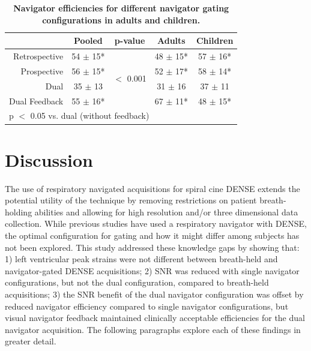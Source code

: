 	\begin{table}
		\centering
		\caption[Navigator efficiencies for different navigator gating configurations in adults and children]{\textbf{Navigator efficiencies for different navigator gating configurations in adults and children.}}
		\label{table:navigator_navefficiency}
		\begin{tabular}{c c c c c}
			\toprule
			\multicolumn{1}{c}{} & \multicolumn{1}{c}{\textbf{Pooled}} & \multicolumn{1}{c}{\textbf{p-value}} & \multicolumn{1}{c}{\textbf{Adults}} & \multicolumn{1}{c}{\textbf{Children}} \\ \midrule
			\multicolumn{1}{r}{Retrospective}   & \multicolumn{1}{c}{54 $\pm$ 15*} & \multirow{4}{*}{$<$ 0.001} & \multicolumn{1}{c}{48 $\pm$ 15*} & \multicolumn{1}{c}{57 $\pm$ 16*}     \\
			\multicolumn{1}{r}{Prospective}    	& \multicolumn{1}{c}{56 $\pm$ 15*} & & \multicolumn{1}{c}{52 $\pm$ 17*} &  \multicolumn{1}{c}{58 $\pm$ 14*}                \\
			\multicolumn{1}{r}{Dual}      		& \multicolumn{1}{c}{35 $\pm$ 13}  & & \multicolumn{1}{c}{31 $\pm$ 16} &   \multicolumn{1}{c}{37 $\pm$ 11}               \\
			\multicolumn{1}{r}{Dual Feedback}   & \multicolumn{1}{c}{55 $\pm$ 16*} & & \multicolumn{1}{c}{67 $\pm$ 11*} &   \multicolumn{1}{c}{48 $\pm$ 15*}               \\
			\bottomrule
			\multicolumn{5}{l}{\footnotesize* p $<$ 0.05 vs. dual (without feedback)} \\
		\end{tabular}
	\end{table}

\section{Discussion}
	The use of respiratory navigated acquisitions for spiral cine DENSE extends the potential utility of the technique by removing restrictions on patient breath-holding abilities and allowing for high resolution \cite{Wehner2014} and/or three dimensional  \cite{Zhong2010a,Kar2014} data collection. While previous studies have used a respiratory navigator with DENSE, the optimal configuration for gating and how it might differ among subjects has not been explored. This study addressed these knowledge gaps by showing that: 1) left ventricular peak strains were not different between breath-held and navigator-gated DENSE acquisitions; 2) SNR was reduced with single navigator configurations, but not the dual configuration, compared to breath-held acquisitions; 3) the SNR benefit of the dual navigator configuration was offset by reduced navigator efficiency compared to single navigator configurations, but visual navigator feedback maintained clinically acceptable efficiencies for the dual navigator acquisition. The following paragraphs explore each of these findings in greater detail.
	
